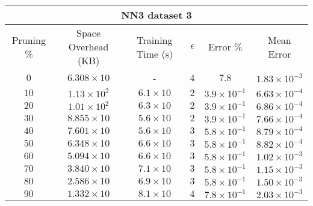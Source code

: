 \begin{adjustwidth}{0cm}{}
\begin{tabular}{cccccc}
\hline
\multicolumn{6}{c}{NN3 dataset 3} \\
\toprule
Pruning \% & Space Overhead (KB) & Training Time (s) & $\epsilon$ & Error \% & Mean Error\\
\midrule
$0$ & $6.308 \times 10$ & - & $4$ & $7.8$ & $1.83 \times 10^{-3}$\\
$10$ & $1.13 \times 10^2 $ & $6.1 \times 10$ & $2$ & $3.9 \times 10^{-1}$ & $6.63 \times 10^{-4}$\\
$20$ & $1.01 \times 10^2 $ & $6.3 \times 10$ & $2$ & $3.9 \times 10^{-1}$ & $6.86 \times 10^{-4}$\\
$30$ & $8.855 \times 10$ & $5.6 \times 10$ & $2$ & $3.9 \times 10^{-1}$ & $7.66 \times 10^{-4}$\\
$40$ & $7.601 \times 10$ & $5.6 \times 10$ & $3$ & $5.8 \times 10^{-1}$ & $8.79 \times 10^{-4}$\\
$50$ & $6.348 \times 10$ & $6.6 \times 10$ & $3$ & $5.8 \times 10^{-1}$ & $8.82 \times 10^{-4}$\\
$60$ & $5.094 \times 10$ & $6.6 \times 10$ & $3$ & $5.8 \times 10^{-1}$ & $1.02 \times 10^{-3}$\\
$70$ & $3.840 \times 10$ & $7.1 \times 10$ & $3$ & $5.8 \times 10^{-1}$ & $1.15 \times 10^{-3}$\\
$80$ & $2.586 \times 10$ & $6.9 \times 10$ & $3$ & $5.8 \times 10^{-1}$ & $1.50 \times 10^{-3}$\\
$90$ & $1.332 \times 10$ & $8.1 \times 10$ & $4$ & $7.8 \times 10^{-1}$ & $2.03 \times 10^{-3}$\\
\bottomrule
\end{tabular}
\end{adjustwidth}

\par\null\par
\par\null\par

